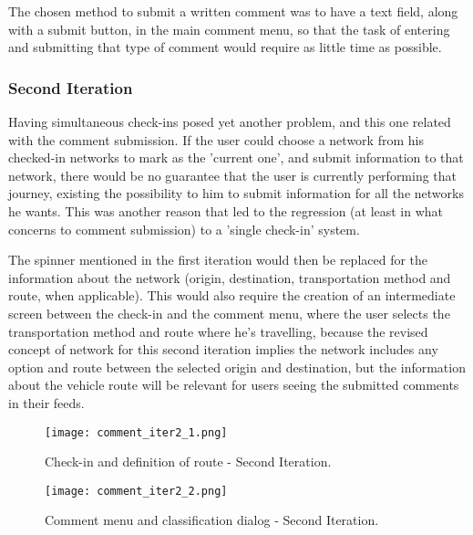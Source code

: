 The chosen method to submit a written comment was to have a text field, along with a submit button, in the main comment menu, so that the task of entering and submitting that type of comment would require as little time as possible.

\newpage

\subsubsection{Second Iteration}

Having simultaneous check-ins posed yet another problem, and this one related with the comment submission. If the user could choose a network from his checked-in networks to mark as the 'current one', and submit information to that network, there would be no guarantee that the user is currently performing that journey, existing the possibility to him to submit information for all the networks he wants. This was another reason that led to the regression (at least in what concerns to comment submission) to a 'single check-in' system.

The spinner mentioned in the first iteration would then be replaced for the information about the network (origin, destination, transportation method and route, when applicable). This would also require the creation of an intermediate screen between the check-in and the comment menu, where the user selects the transportation method and route where he's travelling, because the revised concept of network for this second iteration implies the network includes any option and route between the selected origin and destination, but the information about the vehicle route will be relevant for users seeing the submitted comments in their feeds.

\begin{figure}[h!]
  \begin{center}
    \leavevmode
    \texttt{[image: comment\_iter2\_1.png]}
    \caption{Check-in and definition of route - Second Iteration.}
    \label{fig:comment_iter2_1}
  \end{center}
\end{figure}

\begin{figure}[h!]
  \begin{center}
    \leavevmode
    \texttt{[image: comment\_iter2\_2.png]}
    \caption{Comment menu and classification dialog - Second Iteration.}
    \label{fig:comment_iter2_2}
  \end{center}
\end{figure}

